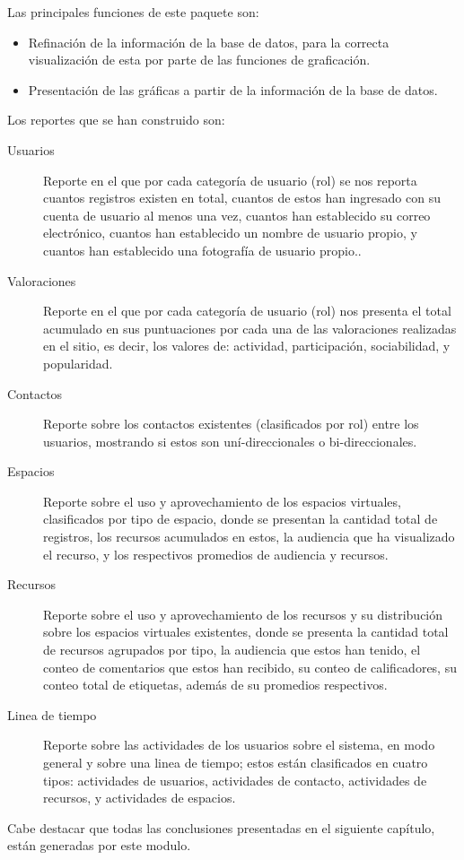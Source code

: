 Las principales funciones de este paquete son:

\begin{itemize}
\item Refinación de la información de la base de datos, para la correcta
visualización de esta por parte de las funciones de graficación.
\item Presentación de las gráficas a partir de la información de la base de
datos.
\end{itemize}

Los reportes que se han construido son:

\begin{description}
\item [Usuarios] Reporte en el que por cada categoría de usuario (rol) se nos
reporta cuantos registros existen en total, cuantos de estos han ingresado con
su cuenta de usuario al menos una vez, cuantos han establecido su correo
electrónico, cuantos han establecido un nombre de usuario propio, y cuantos han
establecido una fotografía de usuario propio..
\item [Valoraciones] Reporte en el que por cada categoría de usuario (rol) nos
presenta el total acumulado en sus puntuaciones por cada una de las valoraciones
realizadas en el sitio, es decir, los valores de: actividad, participación,
sociabilidad, y popularidad.
\item [Contactos] Reporte sobre los contactos existentes (clasificados por rol)
entre los usuarios, mostrando si estos son uní-direccionales o
bi-direccionales.
\item [Espacios] Reporte sobre el uso y aprovechamiento de los espacios
virtuales, clasificados por tipo de espacio, donde se presentan la cantidad
total de registros, los recursos acumulados en estos, la audiencia que ha
visualizado el recurso, y los respectivos promedios de audiencia y recursos.
\item [Recursos] Reporte sobre el uso y aprovechamiento de los recursos y su
distribución sobre los espacios virtuales existentes, donde se presenta la
cantidad total de recursos agrupados por tipo, la audiencia que estos han
tenido, el conteo de comentarios que estos han recibido, su conteo de
calificadores, su conteo total de etiquetas, además de su promedios respectivos.
\item [Linea de tiempo] Reporte sobre las actividades de los usuarios sobre el
sistema, en modo general y sobre una linea de tiempo; estos están clasificados
en cuatro tipos: actividades de usuarios, actividades de contacto, actividades
de recursos, y actividades de espacios.
\end{description}

Cabe destacar que todas las conclusiones presentadas en el siguiente capítulo,
están generadas por este modulo.

